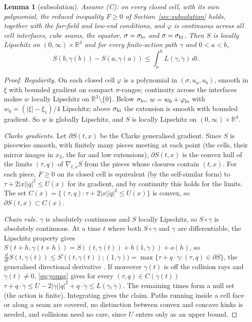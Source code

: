 \documentclass[11pt]{article}
\newtheorem{lemma}[theorem]{Lemma}
\theoremstyle{definition}
\begin{document}
\begin{lemma}[subsolution]\label{lem:sub}
Assume (C): on every closed cell, with its own polynomial, the reduced inequality $F\ge0$ of
Section~\ref{sec:subsolution} holds, together with the far-field and low-end conditions, and $\varphi$ is continuous
across all cell interfaces, cube seams, the equator, $\sigma=\sigma_{\rm lo}$ and $\sigma=\sigma_{\rm hi}$. Then
$S$ is locally Lipschitz on $(0,\infty)\times\mathbb R^3$ and for every finite-action path $\gamma$ and $0<a<b$,
\[
  S(b,\gamma(b))-S(a,\gamma(a))\le\int_a^bL(\gamma,\dot\gamma)\,dt .
\]
\end{lemma}
\begin{proof}
\emph{Regularity.} On each closed cell $\varphi$ is a polynomial in $(\sigma,u_a,u_b)$, smooth in $\xi$ with bounded
gradient on compact $\sigma$-ranges; continuity across the interfaces makes $w$ locally Lipschitz on
$\mathbb R^3\setminus\{0\}$. Below $\sigma_{\rm lo}$, $w=w_0+\varphi_{\rm lo}$ with $w_0=(|\xi|-\xi_1)/4$ Lipschitz;
above $\sigma_{\rm hi}$ the extension is smooth with bounded gradient. So $w$ is globally Lipschitz, and
$S$ is locally Lipschitz on $(0,\infty)\times\mathbb R^3$.

\emph{Clarke gradients.} Let $\partial S(t,x)$ be the Clarke generalised gradient. Since $S$ is piecewise smooth, with
finitely many pieces meeting at each point (the cells, their mirror images in $x_3$, the far and low extensions),
$\partial S(t,x)$ is the convex hull of the limits $(\tau,q)$ of $\nabla_{t,x}S$ from the pieces whose closures contain
$(t,x)$. For each piece, $F\ge0$ on its closed cell is equivalent (by the self-similar form) to
$\tau+2|x||q|^2\le U(x)$ for its gradient, and by continuity this holds for the limits. The set
$C(x)=\{(\tau,q):\tau+2|x||q|^2\le U(x)\}$ is convex, so $\partial S(t,x)\subset C(x)$.

\emph{Chain rule.} $\gamma$ is absolutely continuous and $S$ locally Lipschitz, so $S\circ\gamma$ is absolutely
continuous. At a time $t$ where both $S\circ\gamma$ and $\gamma$ are differentiable, the Lipschitz property gives
$S(t+h,\gamma(t+h))=S((t,\gamma(t))+h(1,\dot\gamma))+o(h)$, so
$\frac{d}{dt}S(t,\gamma(t))\le S^\circ\bigl((t,\gamma(t));(1,\dot\gamma)\bigr)=\max\{\tau+q\cdot\dot\gamma:(\tau,q)\in\partial S\}$,
the generalised directional derivative \cite[Prop.~2.1.2]{Clarke}. If moreover $\gamma(t)$ is off the
collision rays and $\gamma(t)\neq0$, \eqref{eq:young} gives for every $(\tau,q)\in C(\gamma(t))$
$\tau+q\cdot\dot\gamma\le U-2|\gamma||q|^2+q\cdot\dot\gamma\le L(\gamma,\dot\gamma)$. The remaining times form a null set
(the action is finite). Integrating gives the claim. Paths running inside a cell face or along a seam are covered, no
distinction between convex and concave kinks is needed, and collisions need no care, since $U$ enters only as an upper
bound.
\end{proof}
\end{document}
